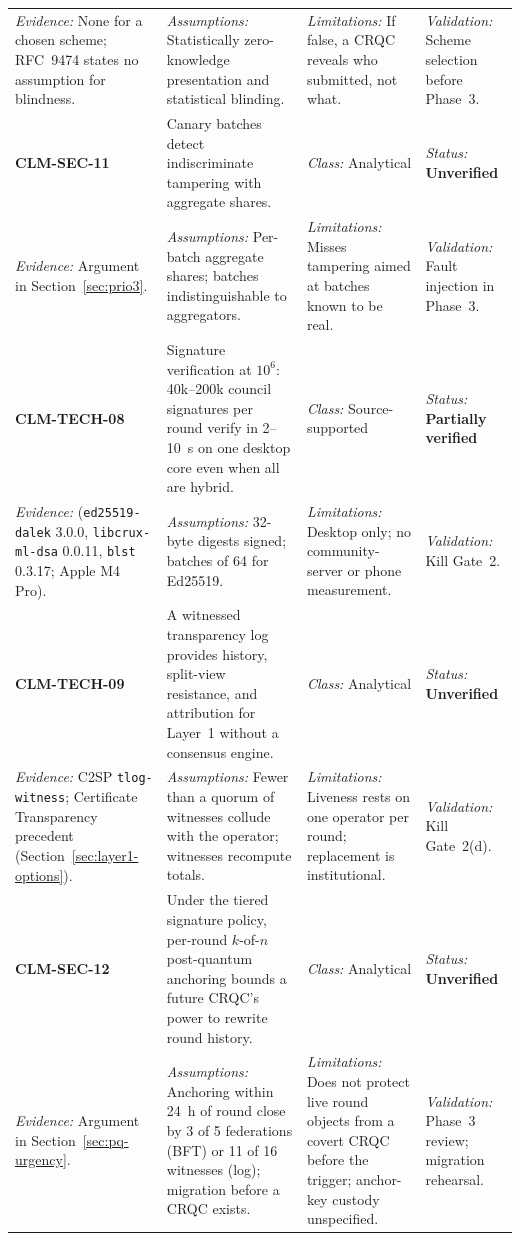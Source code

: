 \documentclass[10pt,twoside,openany]{book}
\theoremstyle{dpepstyle}
\begin{document}
{\begin{longtable}{L{0.92in} L{1.42in} L{1.07in} L{1.12in}}
\emph{Evidence:} None for a chosen scheme; RFC~9474 states no assumption for blindness. & \emph{Assumptions:} Statistically zero-knowledge presentation and statistical blinding. & \emph{Limitations:} If false, a CRQC reveals who submitted, not what. & \emph{Validation:} Scheme selection before Phase~3. \\
\addlinespace[1pt]\midrule
\textbf{CLM-SEC-11} & Canary batches detect indiscriminate tampering with aggregate shares. & \emph{Class:} Analytical & \emph{Status:} \textbf{Unverified} \\*
\emph{Evidence:} Argument in Section~\ref{sec:prio3}. & \emph{Assumptions:} Per-batch aggregate shares; batches indistinguishable to aggregators. & \emph{Limitations:} Misses tampering aimed at batches known to be real. & \emph{Validation:} Fault injection in Phase~3. \\
\addlinespace[1pt]\midrule
\textbf{CLM-TECH-08} & Signature verification at $10^6$: 40k--200k council signatures per round verify in 2--10~s on one desktop core even when all are hybrid. & \emph{Class:} Source-supported & \emph{Status:} \textbf{Partially verified} \\*
\emph{Evidence:}  (\texttt{ed25519-dalek} 3.0.0, \texttt{libcrux-ml-dsa} 0.0.11, \texttt{blst} 0.3.17; Apple M4 Pro). & \emph{Assumptions:} 32-byte digests signed; batches of 64 for Ed25519. & \emph{Limitations:} Desktop only; no community-server or phone measurement. & \emph{Validation:} Kill Gate~2. \\
\addlinespace[1pt]\midrule
\textbf{CLM-TECH-09} & A witnessed transparency log provides history, split-view resistance, and attribution for Layer~1 without a consensus engine. & \emph{Class:} Analytical & \emph{Status:} \textbf{Unverified} \\*
\emph{Evidence:} C2SP \texttt{tlog-witness}; Certificate Transparency precedent (Section~\ref{sec:layer1-options}). & \emph{Assumptions:} Fewer than a quorum of witnesses collude with the operator; witnesses recompute totals. & \emph{Limitations:} Liveness rests on one operator per round; replacement is institutional. & \emph{Validation:} Kill Gate~2(d). \\
\addlinespace[1pt]\midrule
\textbf{CLM-SEC-12} & Under the tiered signature policy, per-round $k$-of-$n$ post-quantum anchoring bounds a future CRQC's power to rewrite round history. & \emph{Class:} Analytical & \emph{Status:} \textbf{Unverified} \\*
\emph{Evidence:} Argument in Section~\ref{sec:pq-urgency}. & \emph{Assumptions:} Anchoring within 24~h of round close by 3 of 5 federations (BFT) or 11 of 16 witnesses (log); migration before a CRQC exists. & \emph{Limitations:} Does not protect live round objects from a covert CRQC before the trigger; anchor-key custody unspecified. & \emph{Validation:} Phase~3 review; migration rehearsal. \\

\end{longtable}}
\end{document}

